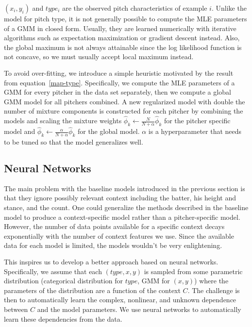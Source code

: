\documentclass{article}
\begin{document}
$(x_i, y_i)$ and $type_i$ are the observed pitch characteristics of example $i$.  Unlike the model for pitch type, it is not generally possible to compute the MLE parameters of a GMM in closed form.  Usually, they are learned numerically with iterative algorithms such as expectation maximization or gradient descent instead.  Also, the global maximum is not always attainable since the log likelihood function is not concave, so we must usually accept local maximum instead.  

To avoid over-fitting, we introduce a simple heuristic motivated by the result from equation~\ref{map-type}.  Specifically, we compute the MLE parameters of a GMM for every pitcher in the data set separately, then we compute a global GMM model for all pitchers combined.  A new regularized model with double the number of mixture components is constructed for each pitcher by combining the models and scaling the mixture weights $ \hat{\phi}_k \leftarrow \frac{N}{N+\alpha} \hat{\phi}_k $ for the pitcher specific model and $ \hat{\phi}_k \leftarrow \frac{\alpha}{N+\alpha} \hat{\phi}_k $ for the global model.  $ \alpha $ is a hyperparameter that needs to be tuned so that the model generalizes well. 

\subsection{Neural Networks}

The main problem with the baseline models introduced in the previous section is that they ignore possibly relevant context including the batter, his height and stance, and the count.  One could generalize the methods described in the baseline model to produce a context-specific model rather than a pitcher-specific model.  However, the number of data points available for a specific context decays exponentially with the number of context features we use.  Since the available data for each model is limited, the models wouldn't be very enlightening.  

This inspires us to develop a better approach based on neural networks.  Specifically, we assume that each $ (type, x, y) $ is sampled from some parametric distribution (categorical distribution for $ type $, GMM for $ (x,y) $) where the parameters of the distribution are a function of the context $C$.  The challenge is then to automatically learn the complex, nonlinear, and unknown dependence between $C$ and the model parameters.  We use neural networks to automatically learn these dependencies from the data.  
\end{document}
